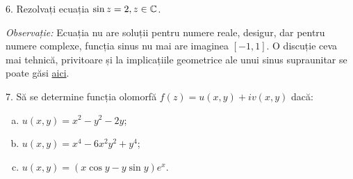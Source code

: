 6. Rezolvați ecuația $ \sin z = 2, z \in \mathbb{C} $.

\emph{Observație:} Ecuația nu are soluții pentru numere reale, desigur,
dar pentru numere complexe, funcția sinus nu mai are imaginea $ [-1, 1] $.
O discuție ceva mai tehnică, privitoare și la implicațiile geometrice ale unui
sinus supraunitar se poate găsi \href{https://math.stackexchange.com/questions/1091160/sine-of-a-complex-number}{aici}.

\vspace{1cm}

7. Să se determine funcția olomorfă $ f(z) = u(x, y) + iv(x, y) $ dacă:
\begin{enumerate}[(a)]
\item $ u(x, y) = x^2 - y^2 - 2y $;
\item $ u(x, y) = x^4 - 6x^2 y^2 + y^4 $;
\item $ u(x, y) = (x \cos y - y\sin y)e^x $.
\end{enumerate}

